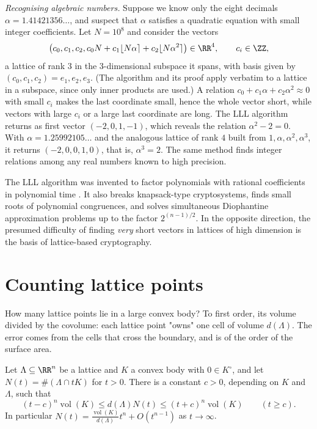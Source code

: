 \begin{example}\label{geometry-of-numbers:example-lll}
\emph{Recognising algebraic numbers.} Suppose we know only the eight decimals $\alpha = 1.41421356\ldots$, and suspect that $\alpha$ satisfies a quadratic equation with small integer coefficients. Let
$N = 10^8$ and consider the vectors
\[
\bigl(c_0, c_1, c_2, c_0N + c_1\lfloor N\alpha\rceil + c_2\lfloor N\alpha^2\rceil\bigr) \in \RR^4, \qquad c_i \in \ZZ,
\]
a lattice of rank $3$ in the $3$-dimensional subspace it spans, with basis given by $(c_0, c_1, c_2) = e_1, e_2, e_3$. (The algorithm and its proof apply verbatim to a lattice in a subspace, since
only inner products are used.) A relation $c_0 + c_1\alpha + c_2\alpha^2 \approx 0$ with small $c_i$ makes the last coordinate small, hence the whole vector short, while vectors with large $c_i$ or a
large last coordinate are long. The LLL algorithm returns as first vector $(-2, 0, 1, -1)$, which reveals the relation $\alpha^2 - 2 = 0$. With $\alpha = 1.25992105\ldots$ and the analogous lattice of rank $4$
built from $1, \alpha, \alpha^2, \alpha^3$, it returns $(-2, 0, 0, 1, 0)$, that is, $\alpha^3 = 2$. The same method finds integer relations among any real numbers known to high precision.
\end{example}

\begin{remark}\label{geometry-of-numbers:remark-lll}
The LLL algorithm was invented to factor polynomials with rational coefficients in polynomial time \cite{lll-1982}. It also breaks knapsack-type cryptosystems, finds small roots of polynomial
congruences, and solves simultaneous Diophantine approximation problems up to the factor $2^{(n-1)/2}$. In the opposite direction, the presumed difficulty of finding \emph{very} short vectors in
lattices of high dimension is the basis of lattice-based cryptography.
\end{remark}

\section{Counting lattice points}\label{geometry-of-numbers:section-counting}

How many lattice points lie in a large convex body? To first order, its volume divided by the covolume: each lattice point "owns" one cell of volume $d(\Lambda)$. The error comes from the cells that
cross the boundary, and is of the order of the surface area.

\begin{theorem}\label{geometry-of-numbers:theorem-counting}
Let $\Lambda \subseteq \RR^n$ be a lattice and $K$ a convex body with $0 \in K^\circ$, and let $N(t) = \#(\Lambda \cap tK)$ for $t > 0$. There is a constant $c > 0$, depending on $K$ and $\Lambda$,
such that
\[
(t - c)^n\operatorname{vol}(K) \leq d(\Lambda)N(t) \leq (t + c)^n\operatorname{vol}(K) \qquad (t \geq c).
\]
In particular $N(t) = \frac{\operatorname{vol}(K)}{d(\Lambda)}t^n + O(t^{n-1})$ as $t \to \infty$.
\end{theorem}

